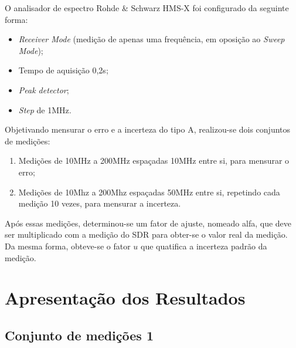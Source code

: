 O analisador de espectro Rohde \& Schwarz HMS-X foi configurado da seguinte forma:

\begin{itemize}
    \item \textit{Receiver Mode} (medição de apenas uma frequência, em oposição ao \textit{Sweep Mode});
    \item Tempo de aquisição 0,2s;
    \item \textit{Peak detector};
    \item \textit{Step} de 1MHz.
\end{itemize}

Objetivando mensurar o erro e a incerteza do tipo A, realizou-se dois conjuntos de medições: 
\begin{enumerate}
    \item Medições de 10MHz a 200MHz espaçadas 10MHz entre si, para mensurar o erro;
    \item Medições de 10Mhz a 200Mhz espaçadas 50MHz entre si, repetindo cada medição 10 vezes, para mensurar a incerteza.
\end{enumerate}

Após essas medições, determinou-se um fator de ajuste, nomeado alfa, que deve ser multiplicado com a medição do SDR para obter-se o valor real da medição. Da mesma forma, obteve-se o fator $u$ que quatifica a incerteza padrão da medição.





\section{Apresentação dos Resultados}
\subsection{Conjunto de medições 1}

